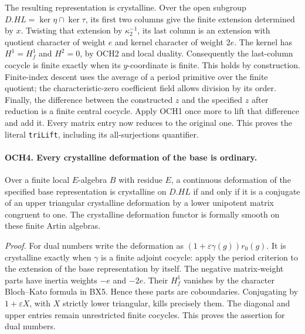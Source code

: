The resulting representation is crystalline.  Over the open subgroup
\(D.HL=\ker\eta\cap\ker\tau\), its first two columns give the
finite extension determined by \(x\).  Twisting that extension by
\(\kappa_2^{-1}\), its last column is an extension with quotient
character of weight \(e\) and kernel character of weight \(2e\).
The kernel has \(H^1=H^1_f\) and \(H^2=0\), by OCH2 and
local duality.  Consequently the last-column cocycle is finite
exactly when its \(y\)-coordinate is finite.  This holds by
construction.  Finite-index descent uses the average of a period
primitive over the finite quotient; the characteristic-zero
coefficient field allows division by its order.
Finally, the difference between the constructed \(z\) and the
specified \(z\) after reduction is a finite central cocycle.
Apply OCH1 once more to lift that difference and add it.  Every
matrix entry now reduces to the original one.  This proves the
literal \texttt{triLift}, including its all-surjections quantifier.

\paragraph{OCH4. Every crystalline deformation of the base is ordinary.}
\label{claim:OCH4}
Over a finite local \(E\)-algebra \(B\) with residue \(E\),
a continuous deformation of the specified base representation is
crystalline on \(D.HL\) if and only if it is a conjugate of an
upper triangular crystalline deformation by a lower unipotent matrix
congruent to one.  The crystalline deformation functor is formally
smooth on these finite Artin algebras.

\emph{Proof.}
For dual numbers write the deformation as
\((1+\varepsilon\gamma(g))r_0(g)\).  It is crystalline exactly
when \(\gamma\) is a finite adjoint cocycle: apply the period
criterion to the extension of the base representation by itself.
The negative matrix-weight parts have inertia weights \(-e\)
and \(-2e\).  Their \(H^1_f\) vanishes by the character
Bloch--Kato formula in BX5.  Hence these parts are coboundaries.
Conjugating by \(1+\varepsilon X\), with \(X\) strictly lower
triangular, kills precisely them.  The diagonal and upper entries
remain unrestricted finite cocycles.  This proves the assertion
for dual numbers.

